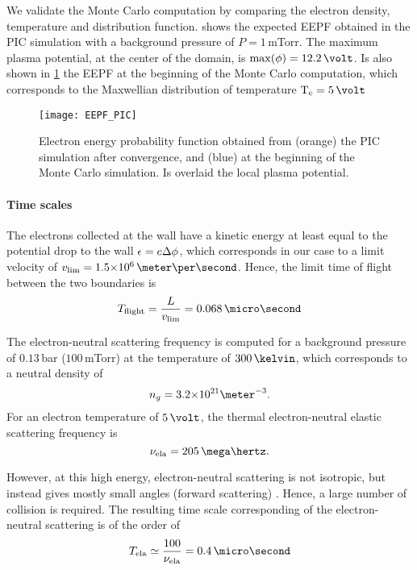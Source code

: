     We validate the Monte Carlo computation by comparing the electron density, temperature and distribution function.
     shows the expected EEPF obtained in the \ac{PIC} simulation with a background pressure of $P=1$\,mTorr.
    The maximum plasma potential, at the center of the domain, is $\max(\phi)=12.2\,\volt$.
    Is also shown in \cref{fig-EEPF_start_end} the EEPF at the beginning of the Monte Carlo computation, which corresponds to the Maxwellian distribution of temperature $\Te=5\,\volt$

    \begin{figure}[hbtp]
      \centering
      \texttt{[image: EEPF\_PIC]}
      \caption{Electron energy probability function obtained from (orange) the PIC simulation after convergence, and (blue) at the beginning of the Monte Carlo simulation. Is overlaid the local plasma potential.}
      \label{fig-EEPF_start_end}
    \end{figure}

    \paragraph{Time scales \\}
    The electrons collected at the wall have a kinetic energy at least equal to the potential drop to the wall $\epsilon = e \Delta \phi$, which corresponds in our case to a limit velocity of $v_{\rm lim} = \sn{1.5}{6} \,\meter\per\second$.
    Hence, the limit time of flight between the two boundaries is
    \[ T_{\rm flight} = \frac{L}{v_{\rm lim}} = 0.068 \,\micro\second  \]

    \vspace{1em}
    The electron-neutral scattering frequency is computed for a background pressure of $0.13$\,bar (${100}$\,mTorr) at the temperature of $300\,\kelvin$, which corresponds to a neutral density of $${n_g = \sn{3.2}{21} \meter^{-3}}.$$
    For an electron temperature of $5\,\volt$, the thermal electron-neutral elastic scattering frequency is 
    \[ \nu_{\rm ela} = 205 \,\mega\hertz.  \] 

    However, at this high energy, electron-neutral scattering is not isotropic, but instead gives mostly small angles (forward scattering) \citep{vahedi1995}.
    Hence, a large number of collision is required.
    The resulting time scale corresponding of the electron-neutral scattering is of the order of 
    \[ T_{\rm ela} \simeq \frac{100}{\nu_{\rm ela}} = 0.4 \,\micro\second  \]
    
